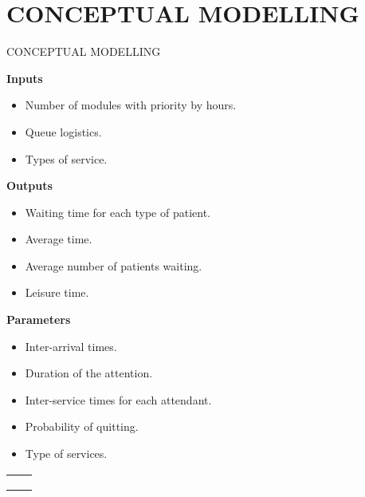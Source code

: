 \section{CONCEPTUAL MODELLING}
\begin{frame}{CONCEPTUAL MODELLING}
    \begin{multicols}{2}
    \textbf{Inputs}
    \begin{itemize}
        \item Number of modules with priority by hours.
        \item Queue logistics.
        \item Types of service.
    \end{itemize}
    \vspace{.5cm}
    \textbf{Outputs}
    \begin{itemize}
    \item Waiting time for each type of patient.
    \item Average time.
    \item Average number of patients waiting.
    \item Leisure time.
\end{itemize}
    \columnbreak
    
    \textbf{Parameters}
    \begin{itemize}
    \item Inter-arrival times.
    \item Duration of the attention.
    \item Inter-service times for each attendant.
    \item Probability of quitting.
    \item Type of services.
    \end{itemize}
    \vspace{1cm}
    \begin{tabular}{cc}
         &  \\
         & \\
         &
    \end{tabular}
    
    \end{multicols}
\end{frame}

